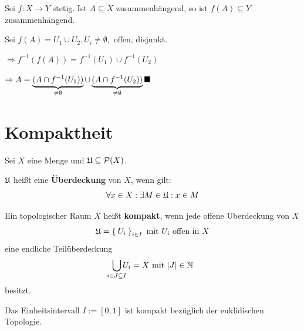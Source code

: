 \begin{bemerkung}
    Sei $f:X \rightarrow Y$ stetig. Ist $A \subseteq X$ zusammenhängend,
    so ist $f(A) \subseteq Y$ zusammenhängend.
\end{bemerkung}

\begin{beweis}
    Sei $f(A) = U_1 \cup U_2, U_i \neq \emptyset,$ offen, disjunkt.

    $\Rightarrow f^{-1} (f(A)) = f^{-1}(U_1) \cup f^{-1}(U_2)$

    $\Rightarrow A = \underbrace{(A \cap f^{-1}(U_1))}_{\neq \emptyset} \cup \underbrace{(A \cap f^{-1}(U_2))}_{\neq \emptyset} \qed$
\end{beweis}

\section{Kompaktheit}
\begin{definition}%
    Sei $X$ eine Menge und $\mathfrak{U} \subseteq \mathcal{P}(X)$.

    $\mathfrak{U}$ heißt eine \textbf{Überdeckung} von $X$, wenn gilt:
    \[\forall x \in X: \exists M \in \mathfrak{U}: x \in M\]
\end{definition}

\begin{definition}%
    Ein topologischer Raum $X$ heißt \textbf{kompakt}, wenn jede
    offene Überdeckung von $X$
    \[\mathfrak{U} = \Set{U_i}_{i \in I} \text{ mit } U_i \text{ offen in } X\]
    eine endliche Teilüberdeckung 
    \[\bigcup_{\mathclap{i \in J \subseteq I}} U_i = X \text{ mit } |J| \in \mdn\]
    besitzt.
\end{definition}


\begin{bemerkung}\label{abgeschlossen01IstKompakt}
    Das Einheitsintervall $I := [0,1]$ ist kompakt bezüglich der 
    euklidischen Topologie.
\end{bemerkung}

